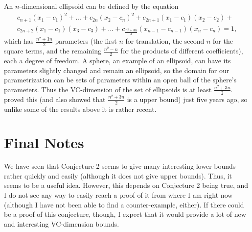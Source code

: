 \documentclass[12pt]{amsart}
\newcommand{\0}{\mat{0}}
\newcommand{\1}{\mathds{1}}
\begin{document}
An $n$-dimensional ellipsoid can be defined by the equation
\begin{multline*}
c_{n + 1}(x_1 - c_1)^2 + ... + c_{2n}(x_2 - c_n)^2 + c_{2n + 1}(x_1 - c_1)(x_2 - c_2) + \\
c_{2n + 2}(x_1 - c_1)(x_3 - c_3) + ... + c_{\frac{n^2 + 3n}{2}}(x_{n - 1} - c_{n - 1})(x_n - c_n) = 1,
\end{multline*}
which has $\frac{n^2 + 3n}{2}$ parameters (the first $n$ for translation, the second $n$ for the square terms, and the remaining $\frac{n^2 - n}{2}$ for the products of different coefficients), each a degree of freedom. A sphere, an example of an ellipsoid, can have its parameters slightly changed and remain an ellipsoid, so the domain for our parametrization can be sets of parameters within an open ball of the sphere's parameters. Thus the VC-dimension of the set of ellipsoids is at least $\frac{n^2 + 3n}{2}.$ \citep{ellipsoids} proved this (and also showed that $\frac{n^2 + 3n}{2}$ is a upper bound) just five years ago, so unlike some of the results above it is rather recent.

\section{Final Notes}

We have seen that Conjecture 2 seems to give many interesting lower bounds rather quickly and easily (although it does not give upper bounds). Thus, it seems to be a useful idea. However, this depends on Conjecture 2 being true, and I do not see any way to easily reach a proof of it from where I am right now (although I have not been able to find a counter-example, either). If there could be a proof of this conjecture, though, I expect that it would provide a lot of new and interesting VC-dimension bounds.

 

\end{document}
